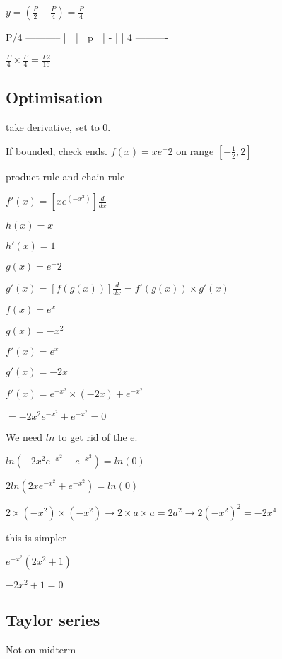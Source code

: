 \documentclass[12pt,a4paper]{article}
\begin{document}
\noindent $y = (\frac{P}{2} - \frac{P}{4}) = \frac{P}{4}$

\begin{verbatim*}
    P/4
-----------
|         |
|         | p
|         | -
|         | 4
----------|
\end{verbatim*}


$\frac{P}{4} \times \frac{P}{4} = \frac{P2}{16}$

\newpage

\subsection*{Optimisation}

take derivative, set to 0.

\noindent If bounded, check ends.
\noindent $f(x) = xe^-2$ on range $[-\frac{1}{2}, 2]$


\noindent product rule and chain rule

\noindent $f'(x) = [xe^(-x^2)] \frac{d}{dx}$

\noindent $h(x) = x$

\noindent $h'(x) = 1$

\noindent $g(x) =e^-2$

\noindent $g'(x) = [f(g(x))]\frac{d}{dx} = f'(g(x)) \times g'(x)$


\noindent $f(x) = e^x$

\noindent $g(x) = -x^2$

\noindent $f'(x) = e^x$

\noindent $g'(x) = -2x$

\noindent $f'(x) = e^{-x^2} \times (-2x) + e^{-x^2}$

$ = -2x^{2}e^{-x^2} + e^{-x^2} = 0$

\noindent We need $ln$ to get rid of the e.

\noindent $ln(-2x^{2}e^{-x^2} + e^{-x^2}) = ln(0)$

\noindent $2ln(2xe^{-x^2} + e^{-x^2}) = ln(0)$

$2 \times (-x^2) \times (-x^2) \to 2 \times a \times a = 2a^2 \to 2(-x^2)^2 = -2x^4$

this is simpler

$e^{-x^2}(2x^2 + 1)$

$-2x^2 + 1 = 0$


\newpage

\subsection*{Taylor series}
Not on midterm
\end{document}
